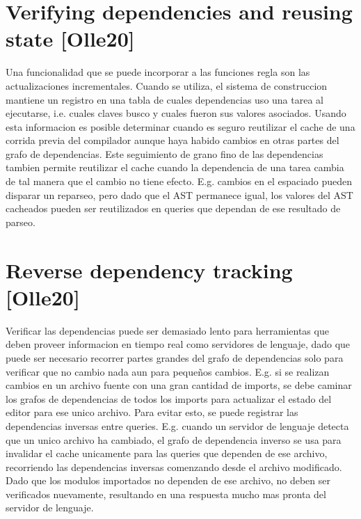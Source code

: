\documentclass[12pt, a4paper]{report}
\begin{document}
\section*{Verifying dependencies and reusing state [Olle20]}

Una funcionalidad que se puede incorporar a las funciones regla son las actualizaciones incrementales.
Cuando se utiliza, el sistema de construccion mantiene un registro en una tabla de cuales dependencias uso una tarea al ejecutarse, i.e. cuales claves busco y cuales fueron sus valores asociados.
Usando esta informacion es posible determinar cuando es seguro reutilizar el cache de una corrida previa del compilador aunque haya habido cambios en otras partes del grafo de dependencias.
Este seguimiento de grano fino de las dependencias tambien permite reutilizar el cache cuando la dependencia de una tarea cambia de tal manera que el cambio no tiene efecto.
E.g. cambios en el espaciado pueden disparar un reparseo, pero dado que el AST permanece igual, los valores del AST cacheados pueden ser reutilizados en queries que dependan de ese resultado de parseo.
\cite{olle_query_based}

\section*{Reverse dependency tracking [Olle20]}

Verificar las dependencias puede ser demasiado lento para herramientas que deben proveer informacion en tiempo real como servidores de lenguaje, dado que puede ser necesario recorrer partes grandes del grafo de dependencias solo para verificar que no cambio nada aun para pequeños cambios.
E.g. si se realizan cambios en un archivo fuente con una gran cantidad de imports, se debe caminar los grafos de dependencias de todos los imports para actualizar el estado del editor para ese unico archivo.
Para evitar esto, se puede registrar las dependencias inversas entre queries.
E.g. cuando un servidor de lenguaje detecta que un unico archivo ha cambiado, el grafo de dependencia inverso se usa para invalidar el cache unicamente para las queries que dependen de ese archivo, recorriendo las dependencias inversas comenzando desde el archivo modificado.
Dado que los modulos importados no dependen de ese archivo, no deben ser verificados nuevamente, resultando en una respuesta mucho mas pronta del servidor de lenguaje.
\cite{olle_query_based}
\end{document}
